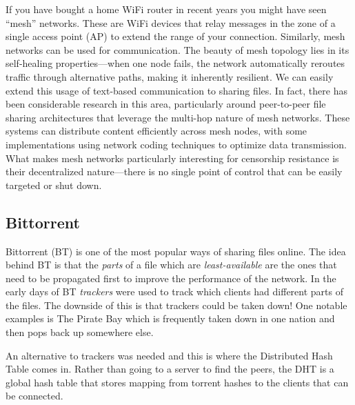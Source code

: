 
If you have bought a home WiFi router in recent years you might have seen
``mesh'' networks. These are WiFi devices that relay messages in the zone of a
single access point (AP) to extend the range of your connection. Similarly, mesh
networks can be used for communication.
The beauty of mesh topology lies in
its self-healing properties---when one node fails, the network automatically
reroutes traffic through alternative paths, making it inherently resilient.
We can easily extend this usage of text-based communication to sharing files.
In fact, there has been considerable research in this area, particularly around
peer-to-peer file sharing architectures that leverage the multi-hop nature of
mesh networks.
These
systems can distribute content efficiently across mesh nodes, with some
implementations using network coding techniques to optimize data transmission.
What makes mesh networks
particularly interesting for censorship resistance is their decentralized
nature---there is no single point of control that can be easily targeted or shut
down.

\subsection{Bittorrent}
\label{bittorrent}

Bittorrent (BT) is one of the most popular ways of sharing files online. The
idea behind BT is that the \emph{parts} of a file which are
\emph{least-available} are the ones that need to be propagated first to improve the performance of the network. In the early days of BT \emph{trackers} were used to track which clients had different parts of the files. The downside of this is that trackers could be taken down! One notable examples is The Pirate Bay which is frequently taken down in one nation and then pops back up somewhere else.

An alternative to trackers was needed and this is where the Distributed Hash Table comes in. Rather than going to a server to find the peers, the DHT is a global hash table that stores mapping from torrent hashes to the clients that can be connected.

